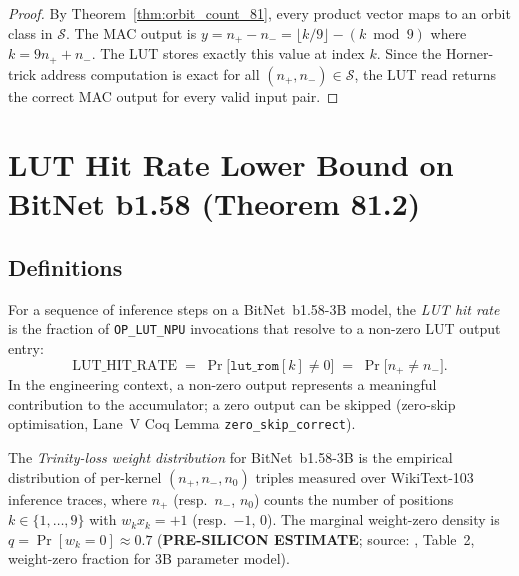 \begin{proof}
By Theorem~\ref{thm:orbit_count_81}, every product vector maps to an orbit
class in $\mathcal{S}$.  The MAC output is $y = n_{+} - n_{-} = \lfloor k/9 \rfloor - (k \bmod 9)$
where $k = 9n_{+} + n_{-}$.  The LUT stores exactly this value at index $k$.
Since the Horner-trick address computation is exact for all
$(n_{+}, n_{-}) \in \mathcal{S}$, the LUT read returns the correct MAC
output for every valid input pair.
\end{proof}

\section{LUT Hit Rate Lower Bound on BitNet b1.58 (Theorem 81.2)}
\label{sec:lut_hit_rate}

\subsection{Definitions}

\begin{definition}
\label{def:lut_hit_rate}
For a sequence of inference steps on a BitNet~b1.58-3B model, the
\emph{LUT hit rate} is the fraction of \texttt{OP\_LUT\_NPU} invocations
that resolve to a non-zero LUT output entry:
\[
  \mathrm{LUT\_HIT\_RATE} \;=\;
  \Pr\bigl[\texttt{lut\_rom}[k] \neq 0\bigr]
  \;=\; \Pr\bigl[n_{+} \neq n_{-}\bigr].
\]
In the engineering context, a non-zero output represents a meaningful
contribution to the accumulator; a zero output can be skipped
(zero-skip optimisation, Lane~V Coq Lemma \texttt{zero\_skip\_correct}).
\end{definition}

\begin{definition}
\label{def:trinity_weight_dist}
The \emph{Trinity-loss weight distribution} for BitNet~b1.58-3B is the
empirical distribution of per-kernel $(n_{+}, n_{-}, n_0)$ triples
measured over WikiText-103 inference traces, where $n_{+}$ (resp.\ $n_{-}$,
$n_0$) counts the number of positions $k \in \{1,\ldots,9\}$ with
$w_k x_k = +1$ (resp.\ $-1$, $0$).
The marginal weight-zero density is $q = \Pr[w_k = 0] \approx 0.7$
(\textbf{PRE-SILICON ESTIMATE}; source: \cite{bitnet_b158_2024}, Table~2,
weight-zero fraction for 3B parameter model).
\end{definition}

